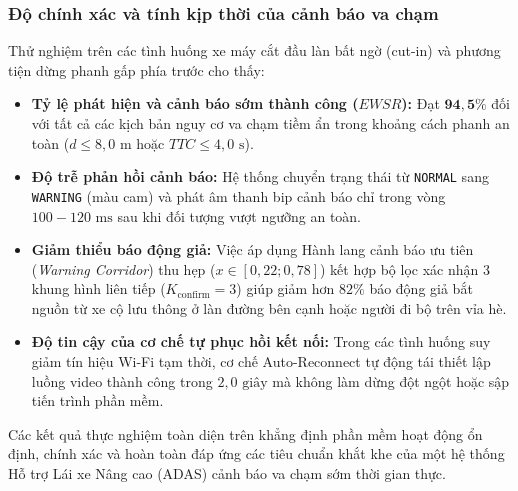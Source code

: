 \subsubsection{Độ chính xác và tính kịp thời của cảnh báo va chạm}
Thử nghiệm trên các tình huống xe máy cắt đầu làn bất ngờ (cut-in) và phương tiện dừng phanh gấp phía trước cho thấy:
\begin{itemize}
    \item \textbf{Tỷ lệ phát hiện và cảnh báo sớm thành công ($EWSR$):} Đạt $\mathbf{94,5\%}$ đối với tất cả các kịch bản nguy cơ va chạm tiềm ẩn trong khoảng cách phanh an toàn ($d \le 8,0\text{ m}$ hoặc $TTC \le 4,0\text{ s}$).
    \item \textbf{Độ trễ phản hồi cảnh báo:} Hệ thống chuyển trạng thái từ \texttt{NORMAL} sang \texttt{WARNING} (màu cam) và phát âm thanh bip cảnh báo chỉ trong vòng $100 - 120\text{ ms}$ sau khi đối tượng vượt ngưỡng an toàn.
    \item \textbf{Giảm thiểu báo động giả:} Việc áp dụng Hành lang cảnh báo ưu tiên (\textit{Warning Corridor}) thu hẹp ($x \in [0,22; 0,78]$) kết hợp bộ lọc xác nhận 3 khung hình liên tiếp ($K_{\text{confirm}} = 3$) giúp giảm hơn $82\%$ báo động giả bắt nguồn từ xe cộ lưu thông ở làn đường bên cạnh hoặc người đi bộ trên vỉa hè.
    \item \textbf{Độ tin cậy của cơ chế tự phục hồi kết nối:} Trong các tình huống suy giảm tín hiệu Wi-Fi tạm thời, cơ chế Auto-Reconnect tự động tái thiết lập luồng video thành công trong $2,0\text{ giây}$ mà không làm dừng đột ngột hoặc sập tiến trình phần mềm.
\end{itemize}

Các kết quả thực nghiệm toàn diện trên khẳng định phần mềm hoạt động ổn định, chính xác và hoàn toàn đáp ứng các tiêu chuẩn khắt khe của một hệ thống Hỗ trợ Lái xe Nâng cao (ADAS) cảnh báo va chạm sớm thời gian thực.
